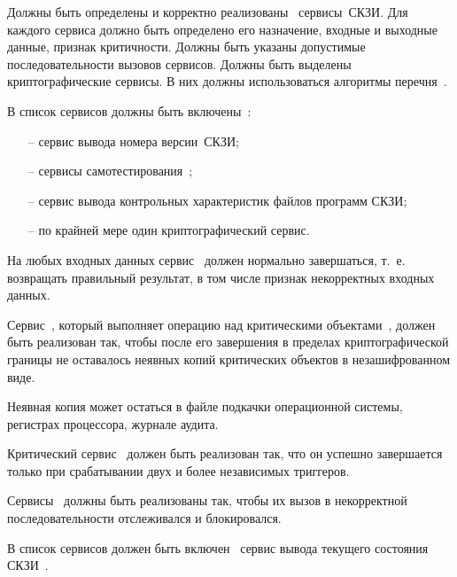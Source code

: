 \label{R.SV.List} %
Должны быть определены и корректно 
реализованы~
сервисы~СКЗИ.
%
Для каждого сервиса должно быть определено его назначение, 
входные и выходные данные, признак критичности.
%
Должны быть указаны допустимые последовательности вызовов сервисов.
%
Должны быть выделены криптографические сервисы.
В них должны использоваться алгоритмы перечня~.

\label{R.SV.Oblig} %
В список сервисов должны быть включены~:
\begin{itemize}
\item[--]
сервис вывода номера версии~СКЗИ;
\item[--]
сервисы самотестирования~;
\item[--]
сервис вывода контрольных характеристик файлов программ СКЗИ;
\item[--]
по крайней мере один криптографический сервис.
\end{itemize}

\label{R.SV.Robust} %
На любых входных данных сервис~ должен нормально 
завершаться, т.~е. возвращать правильный результат,  
в том числе признак некорректных входных данных.

\label{R.SV.Leaks} %
Сервис~, который выполняет операцию над критическими
объектами~, должен быть реализован так, чтобы после его
завершения в пределах криптографической границы не оставалось 
неявных копий критических объектов в незашифрованном виде.

\begin{note*}
Неявная копия может остаться в файле подкачки операционной системы, 
регистрах процессора, журнале аудита. 
\end{note*}

\label{R.SV.Crit} %
Критический сервис~ должен быть реализован так,
что он успешно завершается только при срабатывании двух и более 
независимых триггеров.

\label{R.SV.Seq} %
Сервисы~ должны быть реализованы так, чтобы их вызов в
некорректной последовательности отслеживался и блокировался.

\label{R.SV.Status} %
В список сервисов должен быть включен~
сервис вывода текущего состояния СКЗИ~.

